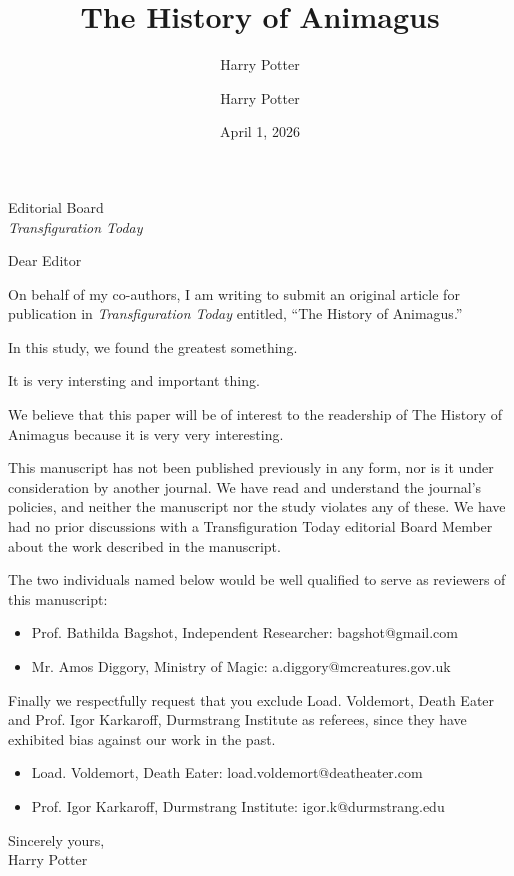 \documentclass[
]{letter}
\title{The History of Animagus}
\author{Harry Potter}
\date{April 1, 2026}
\providecommand{\tightlist}{%
  \setlength{\itemsep}{0pt}\setlength{\parskip}{0pt}}
\begin{document}
\signature{Harry Potter}
\address{Harry Potter\\ Hogwarts Scholl of Magic and Wizardry\\Gryffindor\\Highlands\\United Kingdom}
\begin{letter}{
    Editorial Board\\
    \textit{Transfiguration Today}
}
\opening{Dear Editor}


On behalf of my co-authors, I am writing to submit an original article for publication in \emph{Transfiguration Today} entitled, ``The History of Animagus.''

In this study, we found the greatest something.

It is very intersting and important thing.

We believe that this paper will be of interest to the readership of The History of Animagus because it is very very interesting.

This manuscript has not been published previously in any form, nor is it under consideration by another journal.
We have read and understand the journal's policies, and neither the manuscript nor the study violates any of these.
We have had no prior discussions with a Transfiguration Today editorial Board Member about the work described in the manuscript.

The two individuals named below would be well qualified to serve as reviewers of this manuscript:

\label{recommend}
\begin{itemize}
\tightlist
\item
  Prof. Bathilda Bagshot, Independent Researcher: bagshot@gmail.com
\item
  Mr. Amos Diggory, Ministry of Magic: a.diggory@mcreatures.gov.uk
\end{itemize}

Finally we respectfully request that you exclude
Load. Voldemort, Death Eater
and
Prof. Igor Karkaroff, Durmstrang Institute
as referees, since they have exhibited bias against our work in the past.

\label{exclude}
\begin{itemize}
\tightlist
\item
  Load. Voldemort, Death Eater: load.voldemort@deatheater.com
\item
  Prof. Igor Karkaroff, Durmstrang Institute: igor.k@durmstrang.edu
\end{itemize}



Sincerely yours,\\

Harry Potter

\end{letter}
\end{document}
